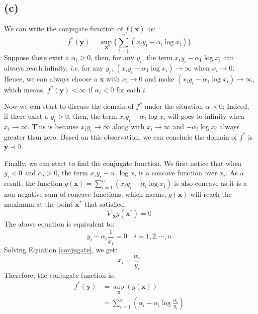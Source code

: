 \documentclass[10pt,a4paper]{article}
\begin{document}
\subsection*{(c)}
We can write the conjugate function of $f(\mathbf{x})$ as:
\begin{equation*}
	f^{*}(\mathbf{y}) = \displaystyle\sup_{\mathbf{x}} \{ \displaystyle\sum_{i = 1}^{n}(x_{i}y_{i} - \alpha_{i}\log{x_{i}}) \}
\end{equation*}
Suppose there exist a $\alpha_{i} \geq 0$, then, for any $y_{i}$, the term $x_{i} y_{i} - \alpha_{1} \log{x_{i}}$ can always reach infinity, \textit{i.e.} for any $y_{i}$, $(x_{i} y_{i} - \alpha_{1} \log{x_{i}}) \rightarrow \infty$ when $x_{i} \rightarrow 0$. Hence, we can always choose a $\mathbf{x}$ with $x_{i} \rightarrow 0$ and make $(x_{i} y_{i} - \alpha_{1} \log{x_{i}}) \rightarrow \infty$, which means, $f^{*}(\mathbf{y}) < \infty$ if $\alpha_{i} < 0$ for each $i$.

Now we can start to discuss the domain of $f^{*}$ under the situation $\alpha \prec 0$: Indeed, if there exist a $y_{i} > 0$, then, the term $x_{i} y_{i} - \alpha_{1} \log{x_{i}}$ will goes to infinity when $x_{i} \rightarrow \infty$. This is because $x_{i} y_{i} \rightarrow \infty$ along with $x_{i} \rightarrow \infty$ and $-\alpha_{i}\log{x_{i}}$ always greater than zero. Based on this observation, we can conclude the domain of $f^{*}$ is $\mathbf{y} \prec 0$.

Finally, we can start to find the conjugate function. We first notice that when $y_{i} < 0$ and $\alpha_{i} > 0$, the term $x_{i} y_{i} - \alpha_{1} \log{x_{i}}$ is a concave function over $x_{i}$. As a result, the function $g(\mathbf{x}) = \displaystyle\sum_{i = 1}^{n}(x_{i}y_{i} - \alpha_{i}\log{x_{i}})$ is also concave as it is a non-negative sum of concave functions, which means, $g(\mathbf{x})$ will reach the maximum at the point $\mathbf{x^{*}}$ that satisfied:
\begin{equation*}
	\nabla_{\mathbf{x}} g(\mathbf{x^{*}}) = 0
\end{equation*}
The above equation is equivalent to:
\begin{equation}
	y_{i} - \alpha_{i} \frac{1}{x_{i}} = 0 \quad i = 1, 2, \cdots, n
	\label{conjugate}
\end{equation}
Solving Equation \ref{conjugate}, we get:
\begin{equation*}
	x_{i} = \frac{\alpha_{i}}{y_{i}}
\end{equation*}
Therefore, the conjugate function is:
\begin{equation*}
	\begin{aligned}
		f^{*}(\mathbf{y}) &= \displaystyle\sup_{\mathbf{x}}(g(\mathbf{x})) \\
		&= \displaystyle\sum_{i = 1}^{n}(\alpha_{i} - \alpha_{i} \log{\frac{\alpha_{i}}{y_{i}}})
	\end{aligned}
\end{equation*}
\end{document}

